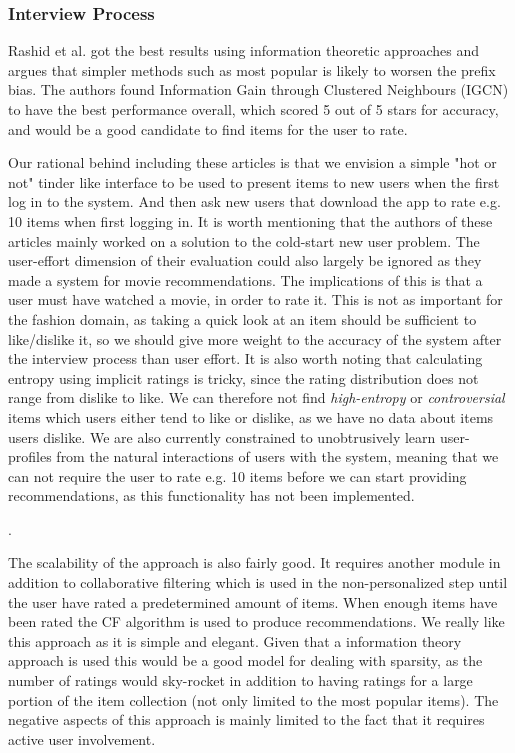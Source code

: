 \subsubsection{Interview Process}

Rashid et al. \cite{Rashid2008} got the best results using information
theoretic approaches and argues that simpler methods such as most popular is
likely to worsen the prefix bias. The authors found Information Gain through
Clustered Neighbours (IGCN) to have the best performance overall, which scored
5 out of 5 stars for accuracy, and would be a good candidate to find items for
the user to rate.

Our rational behind including these articles is that we envision a simple "hot
or not" tinder like interface to be used to present items to new users when the
first log in to the system. And then ask new users that download the app to
rate e.g. 10 items when first logging in. It is worth mentioning that the
authors of these articles mainly worked on a solution to the cold-start new
user problem. The user-effort dimension of their evaluation could also largely
be ignored as they made a system for movie recommendations. The implications of
this is that a user must have watched a movie, in order to rate it. This is not
as important for the fashion domain, as taking a quick look at an item should
be sufficient to like/dislike it, so we should give more weight to the accuracy
of the system after the interview process than user effort. It is also worth
noting that calculating entropy using implicit ratings is tricky, since the
rating distribution does not range from dislike to like. We can therefore not
find \emph{high-entropy} or \emph{controversial} items which users either tend
to like or dislike, as we have no data about items users dislike.
We are also currently constrained to unobtrusively learn user-profiles from
the natural interactions of users with the system, meaning
that we can not require the user to rate e.g. 10 items before we can start
providing recommendations, as this functionality has not been implemented.

.

The scalability of the approach is also fairly good. It requires another module
in addition to collaborative filtering which is used in the non-personalized
step until the user have rated a predetermined amount of items. When enough
items have been rated the CF algorithm is used to produce recommendations. We
really like this approach as it is simple and elegant. Given that a information
theory approach is used this would be a good model for dealing with sparsity,
as the number of ratings would sky-rocket in addition to having ratings for a
large portion of the item collection (not only limited to the most popular
items). The negative aspects of this approach is mainly limited to the fact
that it requires active user involvement.

